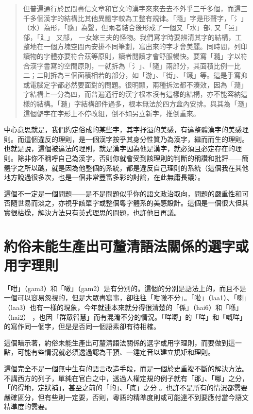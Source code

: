 \documentclass[a5paper, 12pt, openany]{book} %
\begin{document}
\begin{quotation}
但普遍通行於民間書信文章和官文的漢字來來去去不外乎三千多個，而這三千多個漢字的結構比其他異體字較為工整有規律。「瀡」字是形聲字，「氵」（水）為形，「隨」為聲，但兩者結合後形成了一個又「水」部, 又「邑」部，「廴」 又部， 一女嫁三夫的怪物。我們寫字時要辨清其字的結構，工整地在一個方塊空間內安排不同筆劃，寫出來的字才會美麗。同時間，列印讀物的字體亦要符合茲等原則，讀者閱讀才會舒服暢快。要寫「瀡」字以符合漢字書寫的空間原則，一就拆為「氵」、「隨」兩部分，其面積比例一比二；二則拆為三個面積相若的部分，如「游」、「街」、「鐵」等。這是手寫抑或電腦定字都必然要面對的問題。很明顯，兩種拆法都不湊效，因為「瀡」字結構上一分為四，而普遍通行的漢字根本沒有這樣的結構，亦不能容納這樣的結構。「瀡」字結構部件過多，根本無法於四方盒內安排。與其為「瀡」這個僻字在字形上不停改組，倒不如另立新字，推倒重來。

\end{quotation}

中心意思就是，我們約定俗成的某些字，其字抒溢的美感，有違整體漢字的美感理則。而這個違反的理則，是一個漢字按乎其身分性質乃為漢字，繼而而生的理則。也就是說，這個被違法的理則，就是漢字因為他是漢字，就必須且必定存在的理則。除非你不稱呼自己為漢字，否則你就會受到該理則的判斷的稱讚和批評——簡體字之所以醜，就是因為他整個的系統，都是違反自己理則的系統（這個我在其他地方說過很多次，也是一個非常豐富多彩的討論，在此無庸長議）。

這個不一定是一個問題——是不是問題似乎你的語文政治取向，問題的嚴重性和可否隨世易而淡之，亦視乎該單字或整個粵字體系的美感設計。這個是一個很大但其實很枯燥，解決方法只有英式理思的問題，也許他日再議。

\section{約俗未能生產出可釐清語法關係的選字或用字理則}

「咁」（gam3）和「噉」（gam2）是有分別的。這個的分別是語法上的，而且不是一個可以容易忽視的，但是大眾書寫事，卻往往「咁噉不分」。「啦」（laa1）、「喇」（laa3）也有一樣的現象，今年就連本來就分得很清楚的「係」（hai6）和「喺」（hai2）  ，也因「群眾智慧」而有混淆不分的情況。「咩嘢」的「咩」和「嘅咩」的寫作同一個字，但是是否同一個語素卻有待相榷。 

這個暗示著，約俗未能生產出可釐清語法關係的選字或用字理則，而要做到這一點，可能有些情況就必須透過認為干預、一錘定音以建立規矩和理則。

這個完全不是一個無中生有的語言改造手段，而是一個於史重複不斷的解決方法。不講西方的列子，單純在官白之中，透過人權定規的例子就有「那」、「哪」之分，「的得地，定狀補」，甚至之前的「的」、「底」之分 。也許不是所有的情況都需要嚴確區分，但有些則一定要，否則，粵語的精準度則或可能達不到要應付當今語文精準度的需要。
\end{document}
